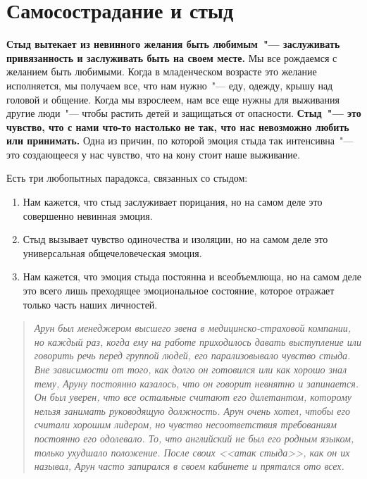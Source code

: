 
\chapter{Самосострадание и стыд} \label{Self-Compassion_and_Shame}

\textbf{Стыд вытекает из невинного желания быть любимым~"--- заслуживать привязанность и заслуживать быть на своем месте.} Мы все рождаемся с желанием быть любимыми. Когда в младенческом возрасте это желание исполняется, мы получаем все, что нам нужно~"--- еду, одежду, крышу над головой и общение\cite{89}. Когда мы взрослеем, нам все еще нужны для выживания другие люди~"--- чтобы растить детей и защищаться от опасности. \textbf{Стыд~"--- это чувство, что с нами что-то настолько не так, что нас невозможно любить или принимать.} Одна из причин, по которой эмоция стыда так интенсивна~"--- это создающееся у нас чувство, что на кону стоит наше выживание.

\vspace{2ex}

Есть три любопытных парадокса, связанных со стыдом:
\begin{enumerate}
	\item Нам кажется, что стыд заслуживает порицания, но на самом деле это совершенно невинная эмоция.	
	\item Стыд вызывает чувство одиночества и изоляции, но на самом деле это универсальная общечеловеческая эмоция.
	\item Нам кажется, что эмоция стыда постоянна и всеобъемлюща, но на самом деле это всего лишь преходящее эмоциональное состояние, которое отражает только часть наших личностей.
\end{enumerate}

\begin{quotation}
	\textit{
		Арун был менеджером высшего звена в медицинско-страховой компании, но каждый раз, когда ему на работе приходилось давать выступление или говорить речь перед группой людей, его парализовывало чувство стыда. Вне зависимости от того, как долго он готовился или как хорошо знал тему, Аруну постоянно казалось, что он говорит невнятно и запинается. Он был уверен, что все остальные считают его дилетантом, которому нельзя занимать руководящую должность. Арун очень хотел, чтобы его считали хорошим лидером, но чувство несоответствия требованиям постоянно его одолевало. То, что английский не был его родным языком, только ухудшало положение. После своих <<атак стыда>>, как он их называл, Арун часто запирался в своем кабинете и прятался ото всех.
	}
\end{quotation}

